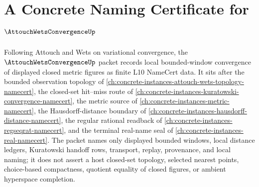 \chapter{A Concrete Naming Certificate for $\AttouchWetsConvergenceUp$}
\label{ch:concrete-instances-attouch-wets-convergence-namecert}

Following Attouch and Wets on variational convergence, the $\AttouchWetsConvergenceUp$ packet records local bounded-window convergence of displayed closed metric figures as finite L10 NameCert data. It sits after the bounded observation topology of \autoref{ch:concrete-instances-attouch-wets-topology-namecert}, the closed-set hit--miss route of \autoref{ch:concrete-instances-kuratowski-convergence-namecert}, the metric source of \autoref{ch:concrete-instances-metric-namecert}, the Hausdorff-distance boundary of \autoref{ch:concrete-instances-hausdorff-distance-namecert}, the regular rational readback of \autoref{ch:concrete-instances-regseqrat-namecert}, and the terminal real-name seal of \autoref{ch:concrete-instances-real-namecert}. The packet names only displayed bounded windows, local distance ledgers, Kuratowski handoff rows, transport, replay, provenance, and local naming; it does not assert a host closed-set topology, selected nearest points, choice-based compactness, quotient equality of closed figures, or ambient hyperspace completion.

